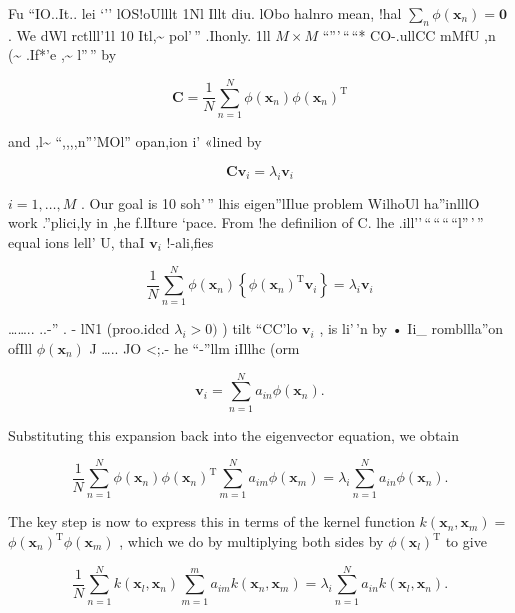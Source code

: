 \documentclass[
  10
]{article}
\begin{document}
Fu ``IO..It.. lei `'' lOS!oUlllt 1Nl Illt diu. lObo halnro mean, !hal
\(\textstyle \sum _ { n } \phi ( \mathbf { x } _ { n } ) = \mathbf { 0 }\)
. We dWl rctlll'1l 10 Itl,\textasciitilde{} pol'\,'' .Ihonly. 1ll
\(M \times M\) ``'''\,``\,``* CO-.ullCC mMfU ,n (\textasciitilde{}
.If*'e ,\textasciitilde{} l''\,'' by

\[
\mathbf {C} = \frac {1}{N} \sum_ {n = 1} ^ {N} \phi (\mathbf {x} _ {n}) \phi (\mathbf {x} _ {n}) ^ {\mathrm{T}}\tag{12.73}
\]

and ,l\textasciitilde{} ``,,,,n'''MOl'' opan,ion i' «lined by

\[
\mathbf {C} \mathbf {v} _ {i} = \lambda_ {i} \mathbf {v} _ {i}\tag{12.74}
\]

\(i = 1 , \dots , M\) . Our goal is 10 soh'\,'' lhis eigen''lIlue
problem WilhoUl ha''inlllO work .''plici,ly in ,he f.lIture `pace. From
!he definilion of C. lhe .ill''\,``\,``\,``\,``l''\,'\,'' equal ions
lell' U, thaI \(\mathbf { v } _ { i }\) !-ali,fies

\[
\frac {1}{N} \sum_ {n = 1} ^ {N} \phi (\mathbf {x} _ {n}) \left\{\phi (\mathbf {x} _ {n}) ^ {\mathrm{T}} \mathbf {v} _ {i} \right\} = \lambda_ {i} \mathbf {v} _ {i}\tag{12.75}
\]

\ldots\ldots.. ..-'' . - lN1 (proo.idcd \(\lambda _ { i } > 0 )\) ) tilt
``CC'lo \(\mathbf { v } _ { i }\) , is li'\,'n by • Ii\_ rombllla''on
ofIll \(\phi ( \mathbf { x } _ { n } )\) J \ldots.. JO \textless;.- he
``-''llm iIllhc (orm

\[
\mathbf {v} _ {i} = \sum_ {n = 1} ^ {N} a _ {i n} \phi (\mathbf {x} _ {n}).\tag{12.76}
\]

Substituting this expansion back into the eigenvector equation, we
obtain

\[
\frac {1}{N} \sum_ {n = 1} ^ {N} \phi (\mathbf {x} _ {n}) \phi (\mathbf {x} _ {n}) ^ {\mathrm{T}} \sum_ {m = 1} ^ {N} a _ {i m} \phi (\mathbf {x} _ {m}) = \lambda_ {i} \sum_ {n = 1} ^ {N} a _ {i n} \phi (\mathbf {x} _ {n}).\tag{12.77}
\]

The key step is now to express this in terms of the kernel function
\(k ( \mathbf { x } _ { n } , \mathbf { x } _ { m } ) =\)
\(\phi (  { \mathbf { x } } _ { n } ) ^ { \mathrm { T } } \phi (  { \mathbf { x } } _ { m } )\)
, which we do by multiplying both sides by
\(\phi ( \mathbf { x } _ { l } ) ^ { \mathrm { T } }\) to give

\[
\frac {1}{N} \sum_ {n = 1} ^ {N} k (\mathbf {x} _ {l}, \mathbf {x} _ {n}) \sum_ {m = 1} ^ {m} a _ {i m} k (\mathbf {x} _ {n}, \mathbf {x} _ {m}) = \lambda_ {i} \sum_ {n = 1} ^ {N} a _ {i n} k (\mathbf {x} _ {l}, \mathbf {x} _ {n}).\tag{12.78}
\]
\end{document}
